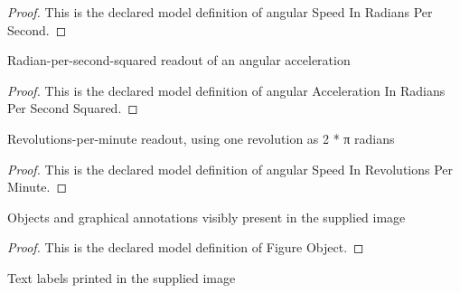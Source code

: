 \begin{proof}
  This is the declared model definition of angular Speed In Radians Per Second.
\end{proof}
\begin{definition}
  \label{def:physics:phyx-mini-0704:phyxminiproblems-problemphyxmini0704-angularaccelerationinradianspersecondsquared}
  Radian-per-second-squared readout of an angular acceleration
\end{definition}
\begin{proof}
  This is the declared model definition of angular Acceleration In Radians Per Second Squared.
\end{proof}
\begin{definition}
  \label{def:physics:phyx-mini-0704:phyxminiproblems-problemphyxmini0704-angularspeedinrevolutionsperminute}
  Revolutions-per-minute readout, using one revolution as 2 * π radians
\end{definition}
\begin{proof}
  This is the declared model definition of angular Speed In Revolutions Per Minute.
\end{proof}
\begin{definition}
  \label{def:physics:phyx-mini-0704:phyxminiproblems-problemphyxmini0704-figureobject}
  Objects and graphical annotations visibly present in the supplied image
\end{definition}
\begin{proof}
  This is the declared model definition of Figure Object.
\end{proof}
\begin{definition}
  \label{def:physics:phyx-mini-0704:phyxminiproblems-problemphyxmini0704-figuretextlabel}
  Text labels printed in the supplied image
\end{definition}
